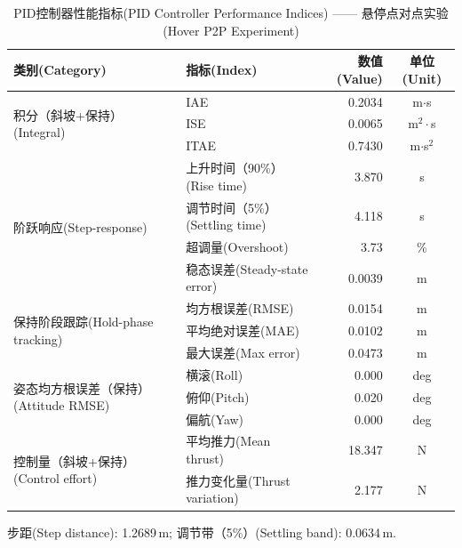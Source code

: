 \begin{table}[htbp]
  \centering
  \caption{PID控制器性能指标(PID Controller Performance Indices) —— 悬停点对点实验(Hover P2P Experiment)}
  \label{tab:pid_indices}
  \begin{tabular}{llrc}
    \hline
    \textbf{类别(Category)} & \textbf{指标(Index)} & \textbf{数值(Value)} & \textbf{单位(Unit)} \\
    \hline
    \multirow{3}{*}{积分（斜坡+保持）(Integral)}
      & IAE   & 0.2034 & m$\cdot$s       \\
      & ISE   & 0.0065 & m$^2\cdot$s     \\
      & ITAE  & 0.7430 & m$\cdot$s$^2$   \\
    \hline
    \multirow{4}{*}{阶跃响应(Step-response)}
      & 上升时间（90\%）(Rise time)      & 3.870  & s   \\
      & 调节时间（5\%）(Settling time)   & 4.118  & s   \\
      & 超调量(Overshoot)                & 3.73   & \%  \\
      & 稳态误差(Steady-state error)     & 0.0039 & m   \\
    \hline
    \multirow{3}{*}{保持阶段跟踪(Hold-phase tracking)}
      & 均方根误差(RMSE) & 0.0154 & m \\
      & 平均绝对误差(MAE) & 0.0102 & m \\
      & 最大误差(Max error) & 0.0473 & m \\
    \hline
    \multirow{3}{*}{姿态均方根误差（保持）(Attitude RMSE)}
      & 横滚(Roll)  & 0.000 & deg \\
      & 俯仰(Pitch) & 0.020 & deg \\
      & 偏航(Yaw)   & 0.000 & deg \\
    \hline
    \multirow{2}{*}{控制量（斜坡+保持）(Control effort)}
      & 平均推力(Mean thrust)      & 18.347 & N \\
      & 推力变化量(Thrust variation) & 2.177  & N \\
    \hline
  \end{tabular}
  \begin{tablenotes}
    \small
    \item 步距(Step distance): 1.2689\,m; \quad 调节带（5\%）(Settling band): 0.0634\,m.
  \end{tablenotes}
\end{table}
